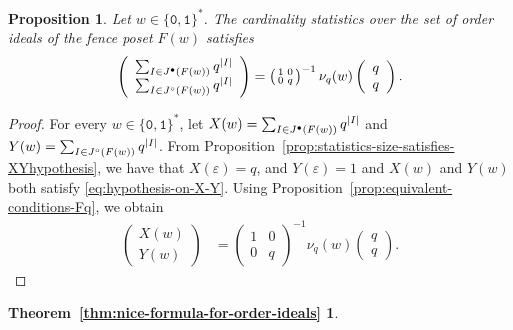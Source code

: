 \documentclass[a4paper,12pt]{amsart}
\newtheorem{proposition}[definition]{Proposition}
\newtheorem*{THEOREMC}{Theorem~\ref{thm:nice-formula-for-order-ideals}}
\newcommand{\0}{\mathtt{0}}
\newcommand{\1}{\mathtt{1}}
\newcommand{\2}{\mathtt{2}}
\newcommand{\3}{\mathtt{3}}
\newcommand{\size}[1]{
    {|#1|}                 %
}
\begin{document}
\begin{proposition}\label{prop:statistics-over-order-ideals}
    Let $w\in\{\0,\1\}^*$.
The cardinality statistics over the set of order ideals
of the fence poset $F(w)$ satisfies
\begin{equation*}
\left(\begin{array}{r}
    \sum_{I\in J^\bullet(F(w))} q^{\size{I}}\\
        \sum_{I\in J^\circ (F(w))}  q^{\size{I}}
\end{array}\right)
    =
    \left(\begin{smallmatrix} 1 & 0 \\ 0 & q \end{smallmatrix}\right)^{-1}
            \nu_q(w)
        \left(\begin{array}{c} q \\ q \end{array}\right).
\end{equation*}
\end{proposition}

\begin{proof}
    For every $w\in\{\0,\1\}^*$,
    let
        $X(w) = \sum_{I\in J^\bullet(F(w))} q^{\size{I}}$ and
        $Y(w) = \sum_{I\in J^\circ(F(w))} q^{\size{I}}$.
From Proposition~\ref{prop:statistics-size-satisfies-XYhypothesis}, we
    have that $X(\varepsilon)=q$,
    and $Y(\varepsilon)=1$ and
    $X(w)$ and $Y(w)$ both satisfy \eqref{eq:hypothesis-on-X-Y}.
    Using Proposition~\ref{prop:equivalent-conditions-Fq},
    we obtain
\begin{align*}
    \left(\begin{array}{r}
            X(w)\\
            Y(w)
            \end{array}\right)
    &= \left(\begin{smallmatrix} 1 & 0 \\ 0 & q \end{smallmatrix}\right)^{-1}
            \nu_q(w)
        \left(\begin{smallmatrix} q \\ q \end{smallmatrix}\right).
\end{align*}
\end{proof}



\begin{THEOREMC}
    \MainTheoremC
\end{THEOREMC}
\end{document}

